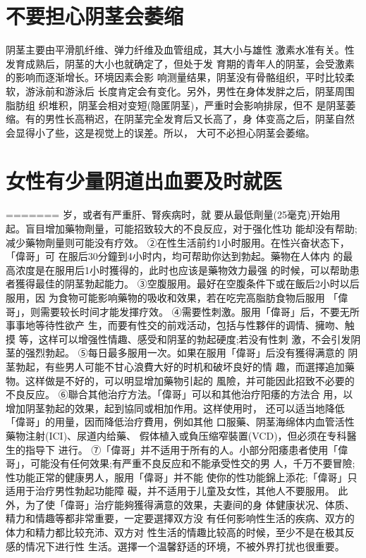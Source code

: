 \documentclass[12pt,UTF8]{ctexbook}
\begin{document}
\section{不要担心阴茎会萎缩}
阴茎主要由平滑肌纤维、弹力纤维及血管组成，其大小与雄性
激素水准有关。性发育成熟后，阴茎的大小也就确定了，但处于发
育期的青年人的阴茎，会受激素的影响而逐渐增长。环境因素会影
响测量结果，阴茎没有骨骼组织，平时比较柔软，游泳前和游泳后
长度肯定会有变化。另外，男性在身体发胖之后，阴茎周围脂肪组
织堆积，阴茎会相对变短(隐匿阴茎)，严重时会影响排尿，但不
是阴茎萎缩。有的男性长高稍迟，在阴茎完全发育后又长高了，身
体变高之后，阴茎自然会显得小了些，这是视觉上的误差。所以，
大可不必担心阴茎会萎缩。

\section{女性有少量阴道出血要及时就医}
=======
岁，或者有严重肝、腎疾病时，就
要从最低劑量(25毫克)开始用
起。盲目增加藥物劑量，可能招致较大的不良反应，对于强化性功
能却没有帮助;减少藥物劑量则可能没有疗效。
②在性生活前约1小时服用。在性兴奋状态下，「偉哥」可
在服后30分鐘到4小时内，均可帮助你达到勃起。藥物在人体内
的最高浓度是在服用后1小时獲得的，此时也应该是藥物效力最强
的时候，可以帮助患者獲得最佳的阴茎勃起能力。
③空腹服用。最好在空腹条件下或在飯后2小时以后服用，因
为食物可能影响藥物的吸收和效果，若在吃完高脂肪食物后服用
「偉哥」，则需要较长时间才能发揮疗效。
④需要性刺激。服用「偉哥」后，不要无所事事地等待性欲产
生，而要有性交的前戏活动，包括与性夥伴的调情、擁吻、触摸
等，这样可以增强性情趣、感受和阴茎的勃起硬度;若没有性刺
激，不会引发阴茎的强烈勃起。
⑤每日最多服用一次。如果在服用「偉哥」后没有獲得满意的
阴茎勃起，有些男人可能不甘心浪費大好的时机和破坏良好的情
趣，而選擇追加藥物。这样做是不好的，可以明显增加藥物引起的
風險，并可能因此招致不必要的不良反应。
⑥聯合其他治疗方法。「偉哥」可以和其他治疗阳痿的方法合
用，以增加阴茎勃起的效果，起到協同或相加作用。这样使用时，
还可以适当地降低「偉哥」的用量，因而降低治疗費用，例如其他
口服藥、阴茎海绵体内血管活性藥物注射(ICI)、尿道内给藥、
假体植入或負压缩窄裝置(VCD)，但必须在专科醫生的指导下
进行。
⑦「偉哥」并不适用于所有的人。小部分阳痿患者使用「偉
哥」，可能没有任何效果;有严重不良反应和不能承受性交的男
人，千万不要冒險;性功能正常的健康男人，服用「偉哥」并不能
使你的性功能錦上添花;「偉哥」只适用于治疗男性勃起功能障
礙，并不适用于儿童及女性，其他人不要服用。
此外，为了使「偉哥」治疗能夠獲得满意的效果，夫妻间的身
体健康状况、体质、精力和情趣等都非常重要，一定要選擇双方没
有任何影响性生活的疾病、双方的体力和精力都比较充沛、双方对
性生活的情趣比较高的时候，至少不是在极其反感的情况下进行性
生活。選擇一个温馨舒适的环境，不被外界打扰也很重要。
\end{document}
